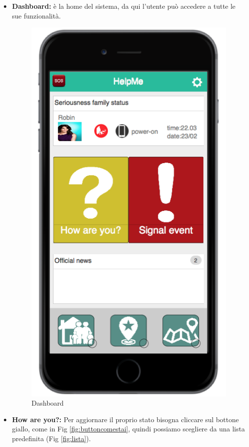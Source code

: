 \begin{itemize}
\item \textbf{Dashboard:} è la home del sistema, da qui l'utente può accedere a tutte le sue funzionalità.
   \begin{figure}[H]
	\centering
	\includegraphics[scale=1]{interfaccia/dash.png}
	\caption{Dashboard}
	\label{fig:logo_OSM}
\end{figure}
\newpage
\item \textbf{How are you?:} Per aggiornare il proprio stato bisogna cliccare sul bottone giallo, come in Fig \ref{fig:buttoncomestai}, quindi possiamo scegliere da una lista predefinita (Fig \ref{fig:lista}).


\end{itemize}
